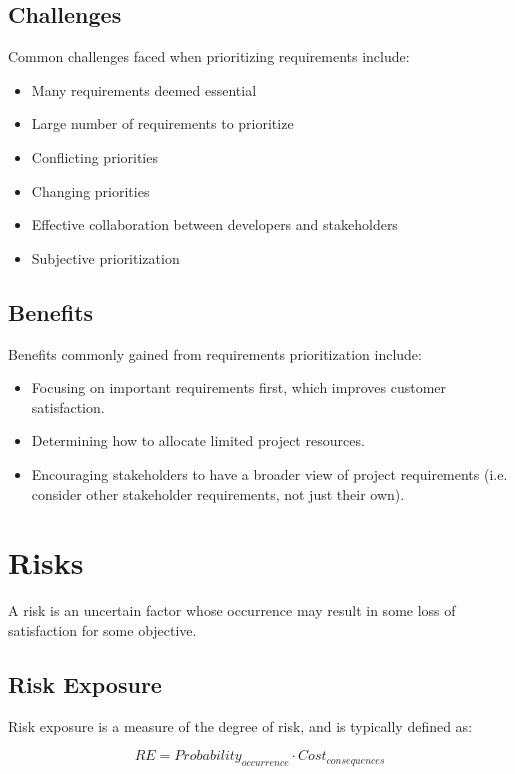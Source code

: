 \documentclass[12pt,titlepage]{article}
\begin{document}
    \subsection{Challenges}
      Common challenges faced when prioritizing requirements include:
      \begin{itemize}
        \item Many requirements deemed essential
        \item Large number of requirements to prioritize
        \item Conflicting priorities
        \item Changing priorities
        \item Effective collaboration between developers and stakeholders
        \item Subjective prioritization
      \end{itemize}

    \subsection{Benefits}
      Benefits commonly gained from requirements prioritization include:
      \begin{itemize}
        \item Focusing on important requirements first, which improves customer satisfaction.
        \item Determining how to allocate limited project resources.
        \item Encouraging stakeholders to have a broader view of project requirements (i.e. consider other stakeholder requirements, not just their own).
      \end{itemize}

  \newpage

  \section{Risks}
    A risk is an uncertain factor whose occurrence may result in some loss of satisfaction for some objective.

    \subsection{Risk Exposure}
      Risk exposure is a measure of the degree of risk, and is typically defined as:

      $$RE = Probability_{occurrence} \cdot Cost_{consequences}$$
\end{document}
